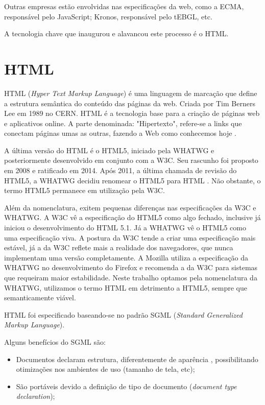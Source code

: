 Outras empresas estão envolvidas nas especificações da web, como a
ECMA, responsável pelo JavaScript; Kronos, responsável pelo tEBGL,
etc.

A tecnologia chave que inaugurou e alavancou este processo é o HTML.
\section{HTML}

HTML (\textit{Hyper Text Markup Language}) é uma linguagem de
marcação que define a estrutura semântica do conteúdo das páginas
da web. Criada por Tim Berners Lee em 1989 no CERN. HTML é a tecnologia
base para a criação de páginas web e aplicativos online. A parte
denominada: "Hipertexto", refere-se a links que conectam páginas umas
as outras, fazendo a Web como conhecemos hoje
\autocite{mdn2015}.

A última versão do HTML é o HTML5, iniciado pela WHATWG
e posteriormente desenvolvido em conjunto com a W3C.
Seu rascunho foi proposto em 2008 e ratificado em 2014.
Após 2011, a última chamada de revisão do HTML5,
a WHATWG decidiu renomear o HTML5 para HTML
\autocite{htmlIsTheNewHtml5}. Não obstante, o termo HTML5
permanece em utilização pela W3C.

Além da nomenclatura, exitem pequenas diferenças nas especificações
da W3C e WHATWG. A W3C vê a especificação do HTML5 como algo fechado,
inclusive já iniciou o desenvolvimento do HTML 5.1. Já a WHATWG vê o
HTML5 como uma especificação viva. A postura da W3C tende a criar uma
especificação mais estável, já a da W3C reflete mais a realidade dos
navegadores, que nunca implementam uma versão completamente. A Mozilla
utiliza a especificação da WHATWG no desenvolvimento do Firefox e
recomenda a da W3C para sistemas que requeiram maior estabilidade. Neste
trabalho optamos pela nomenclatura da WHATWG, utilizamos o termo HTML em
detrimento a HTML5, sempre que semanticamente viável.

HTML foi especificado baseando-se no padrão SGML (\textit{Standard Generalized
Markup Language}).

Alguns benefícios do SGML são:
\begin{itemize}
    \item Documentos declaram estrutura, diferentemente de aparência
, possibilitando otimizações nos ambientes de uso (tamanho de tela,
etc);
    \item São portáveis devido a definição de tipo de documento
(\textit{document type declaration});
\end{itemize}

